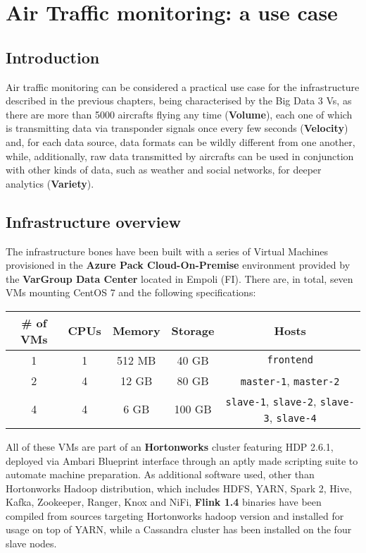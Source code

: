 \chapter{Air Traffic monitoring: a use case}

\section{Introduction}

Air traffic monitoring can be considered a practical use case for the infrastructure described in the previous chapters, being characterised by the Big Data 3 Vs, as there are more than 5000 aircrafts flying any time (\textbf{Volume}), each one of which is transmitting data via transponder signals once every few seconds (\textbf{Velocity}) and, for each data source, data formats can be wildly different from one another, while, additionally, raw data transmitted by aircrafts can be used in conjunction with other kinds of data, such as weather and social networks, for deeper analytics (\textbf{Variety}).

\section{Infrastructure overview}

The infrastructure bones have been built with a series of Virtual Machines provisioned in the \textbf{Azure Pack Cloud-On-Premise} environment provided by the \textbf{VarGroup Data Center} located in Empoli (FI). There are, in total, seven VMs mounting CentOS 7 and the following specifications:
\\    
\begin{table}[!htb]
    \centering
    \begin{tabular}{|c|c|c|c|c|}
        \hline
        \# of VMs & CPUs & Memory & Storage & Hosts \\ \hline
        1 & 1 & 512 MB & 40 GB & \texttt{frontend} \\ \hline
        2 & 4 & 12 GB & 80 GB & \texttt{master-1}, \texttt{master-2} \\ \hline
        4 & 4 & 6 GB & 100 GB & \texttt{slave-1}, \texttt{slave-2}, \texttt{slave-3}, \texttt{slave-4} \\ \hline  
    \end{tabular}
\end{table}

All of these VMs are part of an \textbf{Hortonworks} cluster featuring HDP 2.6.1, deployed via Ambari Blueprint interface through an aptly made scripting suite to automate machine preparation. As additional software used, other than Hortonworks Hadoop distribution, which includes HDFS, YARN, Spark 2, Hive, Kafka, Zookeeper, Ranger, Knox and NiFi, \textbf{Flink 1.4} binaries have been compiled from sources targeting Hortonworks hadoop version and installed for usage on top of YARN, while a Cassandra cluster has been installed on the four slave nodes.

